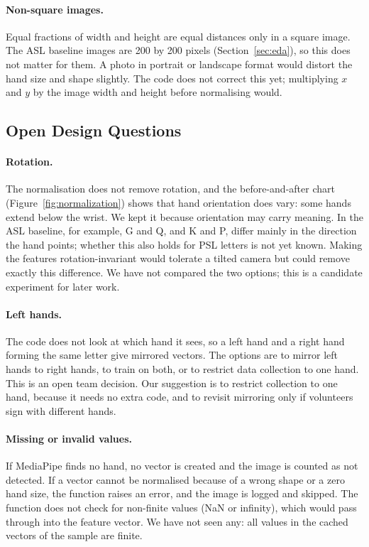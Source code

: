 \paragraph{Non-square images.} Equal fractions of width and height are equal distances only in a square image. The ASL baseline images are 200 by 200 pixels (Section~\ref{sec:eda}), so this does not matter for them. A photo in portrait or landscape format would distort the hand size and shape slightly. The code does not correct this yet; multiplying $x$ and $y$ by the image width and height before normalising would.

\subsection{Open Design Questions}

\paragraph{Rotation.} The normalisation does not remove rotation, and the before-and-after chart (Figure~\ref{fig:normalization}) shows that hand orientation does vary: some hands extend below the wrist. We kept it because orientation may carry meaning. In the ASL baseline, for example, G and Q, and K and P, differ mainly in the direction the hand points; whether this also holds for PSL letters is not yet known. Making the features rotation-invariant would tolerate a tilted camera but could remove exactly this difference. We have not compared the two options; this is a candidate experiment for later work.

\paragraph{Left hands.} The code does not look at which hand it sees, so a left hand and a right hand forming the same letter give mirrored vectors. The options are to mirror left hands to right hands, to train on both, or to restrict data collection to one hand. This is an open team decision. Our suggestion is to restrict collection to one hand, because it needs no extra code, and to revisit mirroring only if volunteers sign with different hands.

\paragraph{Missing or invalid values.} If MediaPipe finds no hand, no vector is created and the image is counted as not detected. If a vector cannot be normalised because of a wrong shape or a zero hand size, the function raises an error, and the image is logged and skipped. The function does not check for non-finite values (NaN or infinity), which would pass through into the feature vector. We have not seen any: all values in the cached vectors of the sample are finite.


